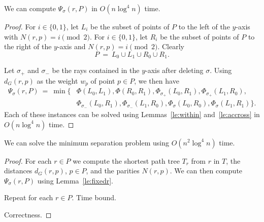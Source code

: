 \documentclass[a4paper,USenglish,numberwithinsect]{lipics}
\begin{document}
\begin{lemma}
\label{le:fixedr}
	We can compute $\Psi_\sigma(r,P)$ in $O(n\log^4 n)$ time.
\end{lemma}
\begin{proof}
	For $i\in \{0,1\}$, let $L_i$ be the subset of points of $P$ to the left of the $y$-axis
	with $N(r,p)=i\pmod 2$.
	For $i\in \{0,1\}$, let $R_i$ be the subset of points of $P$ to the right of the $y$-axis
	and $N(r,p)=i\pmod 2$.
	Clearly
	\[
		P~=~ L_0\cup L_1\cup R_0\cup R_1.
	\]
	
	Let $\sigma_+$ and $\sigma_-$ be the rays contained in the $y$-axis after deleting $\sigma$.
	Using $d_G(r,p)$ as the weight $w_p$ of point $p\in P$, 
	we then have
	\begin{align*}
		 \Psi_\sigma(r,P) ~=~ \min \{ &\Phi( L_0,L_1), \Phi( R_0,R_1),
										\Phi_{\sigma_+}( L_0,R_1), \Phi_{\sigma_+}( L_1,R_0),\\
										&\Phi_{\sigma_-}( L_0,R_1), \Phi_{\sigma_-}( L_1,R_0),
										\Phi_{\sigma}( L_0,R_0), \Phi_{\sigma}(L_1,R_1) \}.
	\end{align*}
	Each of these instances can be solved using Lemmas~\ref{le:within} and~\ref{le:accross} in
	$O(n\log^4 n)$ time.
\end{proof}


\begin{theorem}
	We can solve the minimum separation problem using $O(n^2\log^4 n)$ time.
\end{theorem}
\begin{proof}
	For each $r\in P$ we compute the shortest path tree $T_r$ from $r$ in $T$,
	the distances $d_G(r,p)$, $p\in P$, and the parities $N(r,p)$.
	We can then compute $\Psi_\sigma(r,P)$ using Lemma~\ref{le:fixedr}.
	
	Repeat for each $r\in P$.
	Time bound.
	
	Correctness.
	
\end{proof}



\end{document}

